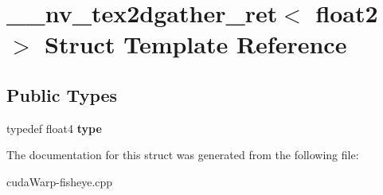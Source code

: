 \hypertarget{struct____nv__tex2dgather__ret_3_01float2_01_4}{}\section{\+\_\+\+\_\+nv\+\_\+tex2dgather\+\_\+ret$<$ float2 $>$ Struct Template Reference}
\label{struct____nv__tex2dgather__ret_3_01float2_01_4}
\subsection*{Public Types}
\begin{DoxyCompactItemize}
\item 
typedef float4 {\bfseries type}\hypertarget{struct____nv__tex2dgather__ret_3_01float2_01_4_a76e4e02b923aeb4777d4010c7be1acc3}{}\label{struct____nv__tex2dgather__ret_3_01float2_01_4_a76e4e02b923aeb4777d4010c7be1acc3}

\end{DoxyCompactItemize}


The documentation for this struct was generated from the following file\+:\begin{DoxyCompactItemize}
\item 
cuda\+Warp-\/fisheye.\+cpp\end{DoxyCompactItemize}
